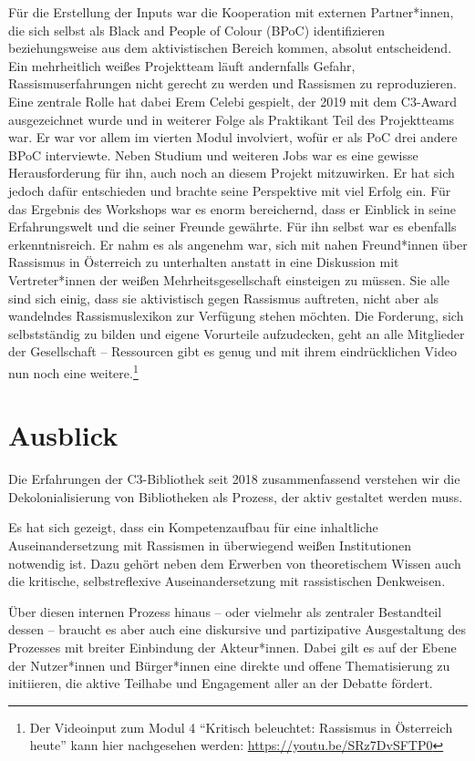 \documentclass[a4paper,
fontsize=11pt,
oneside,
numbers=noperiodatend,
parskip=half-,
bibliography=totoc,
final
]{scrartcl}
\begin{document}
Für die Erstellung der Inputs war die Kooperation mit externen
Partner*innen, die sich selbst als Black and People of Colour (BPoC)
identifizieren beziehungsweise aus dem aktivistischen Bereich kommen,
absolut entscheidend. Ein mehrheitlich weißes Projektteam läuft
andernfalls Gefahr, Rassismuserfahrungen nicht gerecht zu werden und
Rassismen zu reproduzieren. Eine zentrale Rolle hat dabei Erem Celebi
gespielt, der 2019 mit dem C3-Award ausgezeichnet wurde und in weiterer
Folge als Praktikant Teil des Projektteams war. Er war vor allem im
vierten Modul involviert, wofür er als PoC drei andere BPoC interviewte.
Neben Studium und weiteren Jobs war es eine gewisse Herausforderung für
ihn, auch noch an diesem Projekt mitzuwirken. Er hat sich jedoch dafür
entschieden und brachte seine Perspektive mit viel Erfolg ein. Für das
Ergebnis des Workshops war es enorm bereichernd, dass er Einblick in
seine Erfahrungswelt und die seiner Freunde gewährte. Für ihn selbst war
es ebenfalls erkenntnisreich. Er nahm es als angenehm war, sich mit
nahen Freund*innen über Rassismus in Österreich zu unterhalten anstatt
in eine Diskussion mit Vertreter*innen der weißen Mehrheitsgesellschaft
einsteigen zu müssen. Sie alle sind sich einig, dass sie aktivistisch
gegen Rassismus auftreten, nicht aber als wandelndes Rassismuslexikon
zur Verfügung stehen möchten. Die Forderung, sich selbstständig zu
bilden und eigene Vorurteile aufzudecken, geht an alle Mitglieder der
Gesellschaft -- Ressourcen gibt es genug und mit ihrem eindrücklichen
Video nun noch eine weitere.\footnote{Der Videoinput zum Modul 4
  \enquote{Kritisch beleuchtet: Rassismus in Österreich heute} kann hier
  nachgesehen werden: \url{https://youtu.be/SRz7DvSFTP0}}

\hypertarget{ausblick}{%
\section{Ausblick}\label{ausblick}}

Die Erfahrungen der C3-Bibliothek seit 2018 zusammenfassend verstehen
wir die Dekolonialisierung von Bibliotheken als Prozess, der aktiv
gestaltet werden muss.

Es hat sich gezeigt, dass ein Kompetenzaufbau für eine inhaltliche
Auseinandersetzung mit Rassismen in überwiegend weißen Institutionen
notwendig ist. Dazu gehört neben dem Erwerben von theoretischem Wissen
auch die kritische, selbstreflexive Auseinandersetzung mit rassistischen
Denkweisen.

Über diesen internen Prozess hinaus -- oder vielmehr als zentraler
Bestandteil dessen -- braucht es aber auch eine diskursive und
partizipative Ausgestaltung des Prozesses mit breiter Einbindung der
Akteur*innen. Dabei gilt es auf der Ebene der Nutzer*innen und
Bürger*innen eine direkte und offene Thematisierung zu initiieren, die
aktive Teilhabe und Engagement aller an der Debatte fördert.
\end{document}
